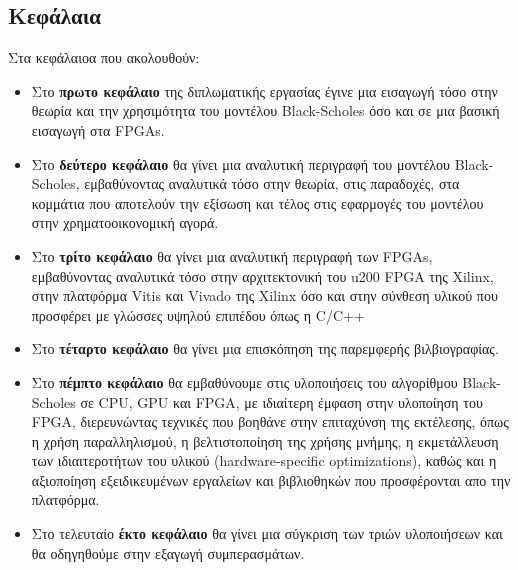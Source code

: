 \subsection{Κεφάλαια}
Στα κεφάλαιοα που ακολουθούν:
\begin{itemize}
    \item Στο \textbf{πρωτο κεφάλαιο} της διπλωματικής εργασίας έγινε μια εισαγωγή τόσο στην θεωρία και την χρησιμότητα του μοντέλου Black-Scholes όσο και σε μια βασική εισαγωγή στα FPGAs.
    \item Στο \textbf{δεύτερο κεφάλαιο} θα γίνει μια αναλυτική περιγραφή του μοντέλου Black-Scholes, εμβαθύνοντας αναλυτικά τόσο στην θεωρία, στις παραδοχές, στα κομμάτια που αποτελούν την εξίσωση και τέλος
    στις εφαρμογές του μοντέλου στην χρηματοοικονομική αγορά.
    \item Στο \textbf{τρίτο κεφάλαιο} θα γίνει μια αναλυτική περιγραφή των FPGAs, εμβαθύνοντας αναλυτικά τόσο στην αρχιτεκτονική του u200 FPGA της Xilinx, στην πλατφόρμα Vitis και Vivado της Xilinx όσο και στην σύνθεση
    υλικού που προσφέρει με γλώσσες υψηλού επιπέδου όπως η C/C++
    \item Στο \textbf{τέταρτο κεφάλαιο} θα γίνει μια επισκόπηση της παρεμφερής βιλβιογραφίας.
    \item Στο \textbf{πέμπτο κεφάλαιο} θα εμβαθύνουμε στις υλοποιήσεις του αλγορίθμου Black-Scholes σε CPU, GPU και FPGA, με ιδιαίτερη έμφαση στην υλοποίηση του FPGA, διερευνώντας 
    τεχνικές που βοηθάνε στην επιταχύνση της εκτέλεσης, όπως η χρήση παραλληλισμού, η βελτιστοποίηση της χρήσης μνήμης, η εκμετάλλευση των ιδιαιτεροτήτων του υλικού 
    (hardware-specific optimizations), καθώς και η αξιοποίηση εξειδικευμένων εργαλείων και βιβλιοθηκών που προσφέρονται απο την πλατφόρμα.
    \item Στο τελευταίο \textbf{έκτο κεφάλαιο} θα γίνει μια σύγκριση των τριών υλοποιήσεων και θα οδηγηθούμε στην εξαγωγή συμπερασμάτων.
\end{itemize}
